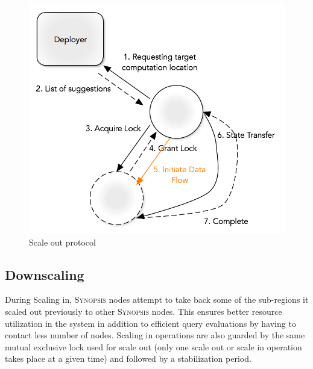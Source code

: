 \begin{figure}
    \centerline{\includegraphics[scale=0.55]{figures/scale-out-protocol.png}}
    \caption{Scale out protocol}
    \label{fig:scale-out-protocol}
\end{figure}
%
\subsection{Downscaling}
During Scaling in, \textsc{Synopsis} nodes attempt to take back some of the sub-regions it scaled out previously to other \textsc{Synopsis} nodes.
This ensures better resource utilization in the system in addition to efficient query evaluations by having to contact less number of nodes.
Scaling in operations are also guarded by the same mutual exclusive lock used for scale out (only one scale out or scale in operation takes place at a given time) and followed by a stabilization period.


